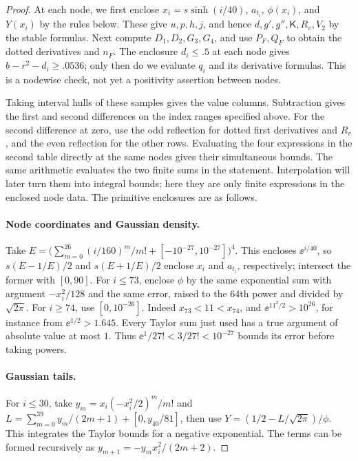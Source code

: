 \begin{proof}
At each node, we first enclose $x_i=s\sinh(i/40)$, $a_{t_i}$, $\phi(x_i)$, and $Y(x_i)$ by the rules below. These give $u,p,h,j$, and hence $d,g',g'',\mathsf K,R_v,V_2$ by the stable formulas. Next compute $D_1,D_2,G_3,G_4$, and use $P_F,Q_F$ to obtain the dotted derivatives and $n_F$. The enclosure $d_i\le.5$ at each node gives $b-r^2-d_i\ge.0536$; only then do we evaluate $q_i$ and its derivative formulas. This is a nodewise check, not yet a positivity assertion between nodes.

Taking interval hulls of these samples gives the value columns. Subtraction gives the first and second differences on the index ranges specified above. For the second difference at zero, use the odd reflection for dotted first derivatives and $R_v$, and the even reflection for the other rows. Evaluating the four expressions in the second table directly at the same nodes gives their simultaneous bounds. The same arithmetic evaluates the two finite sums in the statement. Interpolation will later turn them into integral bounds; here they are only finite expressions in the enclosed node data. The primitive enclosures are as follows.

\paragraph{Node coordinates and Gaussian density.}
Take $E=\big(\sum_{m=0}^{26}(i/160)^m/m!+[-10^{-27},10^{-27}]\big)^4$. This encloses $\ee^{i/40}$, so $s(E-1/E)/2$ and $s(E+1/E)/2$ enclose $x_i$ and $a_{t_i}$, respectively; intersect the former with $[0,90]$. For $i\le73$, enclose $\phi$ by the same exponential sum with argument $-x_i^2/128$ and the same error, raised to the 64th power and divided by $\sqrt{2\pi}$. For $i\ge74$, use $[0,10^{-26}]$. Indeed $x_{73}<11<x_{74}$, and $\ee^{11^2/2}>10^{26}$, for instance from $\ee^{1/2}>1.645$. Every Taylor sum just used has a true argument of absolute value at most $1$. Thus $\ee^1/27!<3/27!<10^{-27}$ bounds its error before taking powers.

\paragraph{Gaussian tails.}
For $i\le30$, take $y_m=x_i(-x_i^2/2)^m/m!$ and $L=\sum_{m=0}^{39}y_m/(2m+1)+[0,y_{40}/81]$, then use $Y=(1/2-L/\sqrt{2\pi})/\phi$. This integrates the Taylor bounds for a negative exponential. The terms can be formed recursively as $y_{m+1}=-y_m x_i^2/(2m+2)$.


\end{proof}
